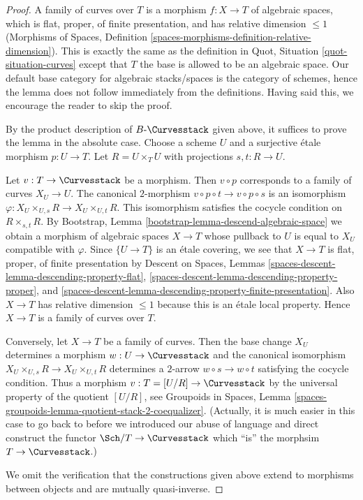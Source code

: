 \begin{proof}
A family of curves over $T$ is a morphism $f : X \to T$ of algebraic
spaces, which is flat, proper, of finite presentation, and has
relative dimension $\leq 1$ (Morphisms of Spaces, Definition
\ref{spaces-morphisms-definition-relative-dimension}).
This is exactly the same as the definition in
Quot, Situation \ref{quot-situation-curves}
except that $T$ the base is allowed to be an algebraic space.
Our default base category for algebraic stacks/spaces
is the category of schemes, hence the lemma does not follow
immediately from the definitions. Having said this, we encourage
the reader to skip the proof.

\medskip\noindent
By the product description of $B\text{-}\Curvesstack$ given above,
it suffices to prove the lemma in the absolute case. Choose a scheme
$U$ and a surjective \'etale morphism $p : U \to T$.
Let $R = U \times_T U$ with projections $s, t : R \to U$.

\medskip\noindent
Let $v : T \to \Curvesstack$ be a morphism. Then $v \circ p$
corresponds to a family of curves $X_U \to U$. The canonical
$2$-morphism $v \circ p \circ t \to v \circ p \circ s$
is an isomorphism $\varphi : X_U \times_{U, s} R \to X_U \times_{U, t} R$.
This isomorphism satisfies the cocycle condition on
$R \times_{s, t} R$.
By Bootstrap, Lemma \ref{bootstrap-lemma-descend-algebraic-space}
we obtain a morphism of algebraic spaces $X \to T$
whose pullback to $U$ is equal to $X_U$ compatible with $\varphi$.
Since $\{U \to T\}$ is an \'etale covering, we see that
$X \to T$ is flat, proper, of finite presentation by
Descent on Spaces, Lemmas
\ref{spaces-descent-lemma-descending-property-flat},
\ref{spaces-descent-lemma-descending-property-proper}, and
\ref{spaces-descent-lemma-descending-property-finite-presentation}.
Also $X \to T$ has relative dimension $\leq 1$ because this is
an \'etale local property. Hence $X \to T$ is a family of curves over $T$.

\medskip\noindent
Conversely, let $X \to T$ be a family of curves. Then the
base change $X_U$ determines a morphism $w : U \to \Curvesstack$
and the canonical isomorphism $X_U \times_{U, s} R \to X_U \times_{U, t} R$
determines a $2$-arrow $w \circ s \to w \circ t$ satisfying the
cocycle condition. Thus a morphism $v : T = [U/R] \to \Curvesstack$
by the universal property of the quotient $[U/R]$, see
Groupoids in Spaces, Lemma
\ref{spaces-groupoids-lemma-quotient-stack-2-coequalizer}.
(Actually, it is much easier in this case to go back to before
we introduced our abuse of language and direct construct
the functor $\Sch/T \to \Curvesstack$ which ``is'' the
morphsim $T \to \Curvesstack$.)

\medskip\noindent
We omit the verification that the constructions given above
extend to morphisms between objects and are mutually quasi-inverse.
\end{proof}






